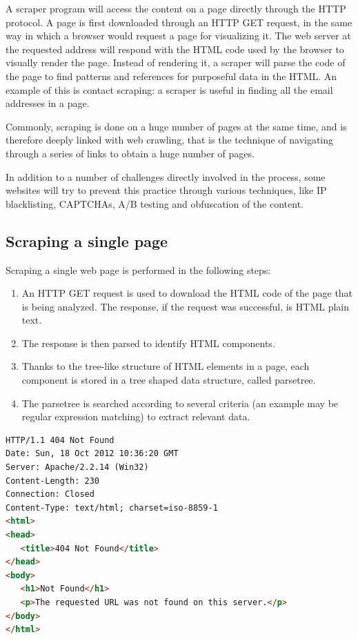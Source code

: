 \documentclass[LaM,oneside,binding=0.6cm]{sapthesis}
\begin{document}
A scraper program will access the content on a page directly through the HTTP protocol. A page is first downloaded through an HTTP GET request, in the same way in which a browser would request a page for visualizing it. The web server at the requested address will respond with the HTML code used by the browser to visually render the page. Instead of rendering it, a scraper will parse the code of the page to find patterns and references for purposeful data in the HTML. An example of this is contact scraping: a scraper is useful in finding all the email addresses in a page.

Commonly, scraping is done on a huge number of pages at the same time, and is therefore deeply linked with web crawling, that is the technique of navigating through a series of links to obtain a huge number of pages.

In addition to a number of challenges directly involved in the process, some websites will try to prevent this practice through various techniques, like IP blacklisting, CAPTCHAs, A/B testing and obfuscation of the content.

\subsection{Scraping a single page}

Scraping a single web page is performed in the following steps:

\begin{enumerate}
	\item An HTTP GET request is used to download the HTML code of the page that is being analyzed. The response, if the request was successful, is HTML plain text.
	\item The response is then parsed to identify HTML components.
	\item Thanks to the tree-like structure of HTML elements in a page, each component is stored in a tree shaped data structure, called parsetree.
	\item The parsetree is searched according to several criteria (an example may be regular expression matching) to extract relevant data.  
\end{enumerate}

\begin{lstlisting}[language=HTML]
HTTP/1.1 404 Not Found
Date: Sun, 18 Oct 2012 10:36:20 GMT
Server: Apache/2.2.14 (Win32)
Content-Length: 230
Connection: Closed
Content-Type: text/html; charset=iso-8859-1
<html>
<head>
   <title>404 Not Found</title>
</head>
<body>
   <h1>Not Found</h1>
   <p>The requested URL was not found on this server.</p>
</body>
</html>
\end{lstlisting}
\label{code:example_html}
\end{document}
